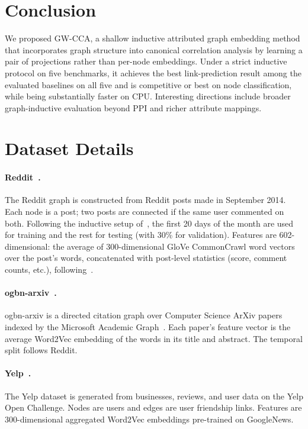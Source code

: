 \documentclass{article}
\begin{document}
\section{Conclusion}
\label{sec:conclusion}

We proposed GW-CCA, a shallow inductive attributed graph embedding method that
incorporates graph structure into canonical correlation analysis by learning
a pair of projections rather than per-node embeddings. Under a strict
inductive protocol on five benchmarks, it achieves the best
link-prediction result among the evaluated baselines on all five and is
competitive or best on node classification, while being substantially
faster on CPU. Interesting directions include broader graph-inductive
evaluation beyond PPI and richer attribute mappings.




\appendix

\section{Dataset Details}
\label{app:data}

\paragraph{Reddit~\citep{hamilton2017inductive}.}
The Reddit graph is constructed from Reddit posts made in September 2014.
Each node is a post; two posts are connected if the same user commented on
both. Following the inductive setup of~\citet{hamilton2017inductive}, the
first 20 days of the month are used for training and the rest for testing
(with 30\% for validation). Features are 602-dimensional: the average of
300-dimensional GloVe CommonCrawl word vectors~\citep{rehurek2010software}
over the post's words, concatenated with post-level statistics (score,
comment counts, etc.), following~\citet{hamilton2017inductive}.

\paragraph{ogbn-arxiv~\citep{hu2020open}.}
ogbn-arxiv is a directed citation graph over Computer Science ArXiv papers
indexed by the Microsoft Academic Graph~\citep{wang2020microsoft}. Each
paper's feature vector is the average Word2Vec embedding of the words in its
title and abstract. The temporal split follows Reddit.

\paragraph{Yelp~\citep{zeng2019graphsaint}.}
The Yelp dataset is generated from businesses, reviews, and user data on the
Yelp Open Challenge. Nodes are users and edges are user friendship links.
Features are 300-dimensional aggregated Word2Vec embeddings pre-trained on
GoogleNews.
\end{document}
